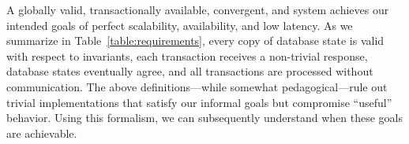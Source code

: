  A globally valid, transactionally available,
convergent, and \cfree system achieves our intended goals of perfect
scalability, availability, and low latency. As we summarize in
Table~\ref{table:requirements}, every copy of database state is valid
with respect to invariants, each transaction receives a non-trivial
response, database states eventually agree, and all transactions are
processed without communication. The above definitions---while
somewhat pedagogical---rule out trivial implementations that satisfy
our informal goals but compromise ``useful'' behavior. Using this
formalism, we can subsequently understand when these goals are
achievable.
